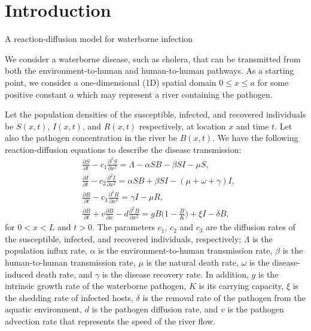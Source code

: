 \newpage 
\section{Introduction}

\noindent
{\large A reaction-diffusion model for waterborne infection}

\vskip0.2in
We consider a waterborne disease, such as cholera, that can be transmitted 
from both the environment-to-human and human-to-human pathways.
As a starting point, we consider a one-dimensional (1D) spatial domain
$ 0 \leq x \leq a$ for some positive constant $a$
which may represent a river containing the pathogen.

Let the population densities of the susceptible, infected, and recovered individuals be
$S(x, t)$, $I(x, t)$, and $R(x,t)$ respectively, at location $x$ and time $t$.
Let also the pathogen concentration in the river be $B(x,t)$. 
We have the following reaction-diffusion equations to describe 
the disease transmission:
\begin{equation}
\begin{aligned}
 & \frac{\partial S}{\partial t} - c_1 \frac{\partial^2 S}{\partial x^2} 
   = \Lambda - \alpha SB - \beta SI - \mu S, \\
 & \frac{\partial I}{\partial t} - c_2 \frac{\partial^2 I}{\partial x^2} 
   =  \alpha SB + \beta SI - (\mu + \omega + \gamma) I, \\
 & \frac{\partial R}{\partial t} - c_3 \frac{\partial^2 R}{\partial x^2}   
   =  \gamma I-\mu R , \\
 &  \frac{\partial B}{\partial t} + v \frac{\partial B}{\partial x} 
   - d \frac{\partial^2 B}{\partial x^2} = g B \big(1 - \frac{B}{K} \big) +\xi I - \delta B,   
\end{aligned} 
 \label{eqn-recdiff}
\end{equation}
for $ 0 < x < L$ and $ t > 0$.
The parameters $c_1$, $c_2$ and $c_3$ are the diffusion rates of the susceptible,
infected, and recovered individuals,
respectively;
$\Lambda$ is the population influx rate, $\alpha$ is the environment-to-human 
transmission rate,
$\beta$ is the human-to-human transmission rate,
$\mu$ is the natural death rate, $\omega$ is the disease-induced death rate, and
$\gamma$ is the disease recovery rate.
In addition, $g$ is the intrinsic growth rate of the waterborne pathogen,
$K$ is its carrying capacity, $\xi$ is the shedding rate of infected hosts,
$\delta$ is the removal rate of the pathogen from the aquatic environment, 
$d$ is the pathogen diffusion rate, 
and $v$ is the pathogen advection rate that represents the speed of the river flow.


